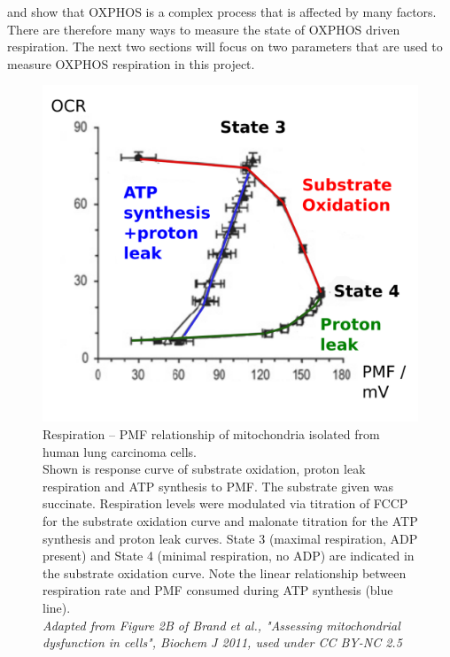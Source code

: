  and  show that OXPHOS is a complex process that is affected by many factors. There are therefore many ways to measure the state of OXPHOS driven respiration. The next two sections will focus on two parameters that are used to measure OXPHOS respiration in this project.

\begin{figure}[htp]
	\centering
    \includegraphics[width=.7\textwidth]{pmfo2}
    \caption[Respiration – PMF relationship of mitochondria]{Respiration – PMF relationship of mitochondria isolated from human lung carcinoma cells.\\Shown is response curve of substrate oxidation, proton leak respiration and ATP synthesis to PMF. The substrate given was succinate. Respiration levels were modulated via titration of FCCP for the substrate oxidation curve and malonate titration for the ATP synthesis and proton leak curves. State 3 (maximal respiration, ADP present) and State 4 (minimal respiration, no ADP) are indicated in the substrate oxidation curve. Note the linear relationship between respiration rate and PMF consumed during ATP synthesis (blue line).\\\emph{Adapted from Figure 2B of Brand et al., "Assessing mitochondrial dysfunction in cells", Biochem J 2011, used under CC BY-NC 2.5}}\label{fig:pmfo2}
\end{figure}
%
